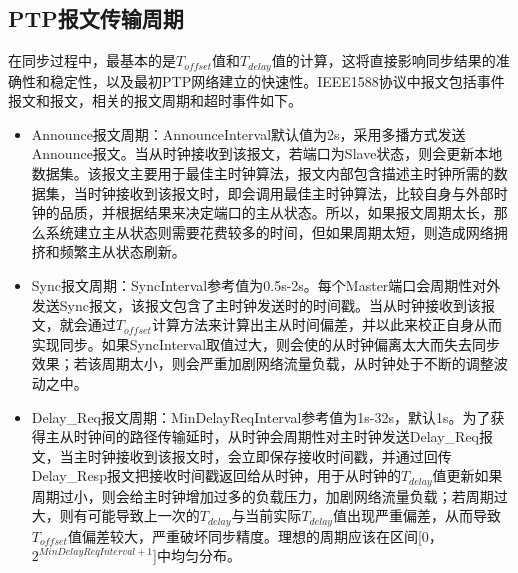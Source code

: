 \subsection{PTP报文传输周期}
在同步过程中，最基本的是$T_{offset}$值和$T_{delay}$值的计算，这将直接影响同步结果的准确性和稳定性，以及最初PTP网络建立的快速性。IEEE1588协议中报文包括事件报文和报文，相关的报文周期和超时事件如下。
\begin{itemize}[noitemsep,topsep=0pt,parsep=0pt,partopsep=0pt]
	\item Announce报文周期：AnnounceInterval默认值为2s，采用多播方式发送Announce报文。当从时钟接收到该报文，若端口为Slave状态，则会更新本地数据集。该报文主要用于最佳主时钟算法，报文内部包含描述主时钟所需的数据集，当时钟接收到该报文时，即会调用最佳主时钟算法，比较自身与外部时钟的品质，并根据结果来决定端口的主从状态\supercite{52}。所以，如果报文周期太长，那么系统建立主从状态则需要花费较多的时间，但如果周期太短，则造成网络拥挤和频繁主从状态刷新。
	\item Sync报文周期：SyncInterval参考值为0.5s-2s。每个Master端口会周期性对外发送Sync报文，该报文包含了主时钟发送时的时间戳。当从时钟接收到该报文，就会通过$T_{offset}$计算方法来计算出主从时间偏差，并以此来校正自身从而实现同步\supercite{52}。如果SyncInterval取值过大，则会使的从时钟偏离太大而失去同步效果；若该周期太小，则会严重加剧网络流量负载，从时钟处于不断的调整波动之中。
	\item Delay\_Req报文周期：MinDelayReqInterval参考值为1s-32s，默认1s。为了获得主从时钟间的路径传输延时，从时钟会周期性对主时钟发送Delay\_Req报文，当主时钟接收到该报文时，会立即保存接收时间戳，并通过回传Delay\_Resp报文把接收时间戳返回给从时钟，用于从时钟的$T_{delay}$值更新\supercite{52}如果周期过小，则会给主时钟增加过多的负载压力，加剧网络流量负载；若周期过大，则有可能导致上一次的$T_{delay}$与当前实际$T_{delay}$值出现严重偏差，从而导致$T_{offset}$值偏差较大，严重破坏同步精度。理想的周期应该在区间[0， $2^{MinDelayReqInterval+1}$]中均匀分布。
\end{itemize}

